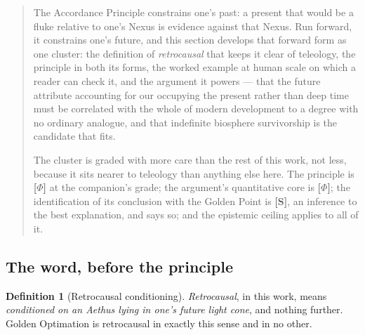 \documentclass[11pt]{article}
\numberwithin{equation}{section}
\theoremstyle{plain}
\theoremstyle{definition}
\newtheorem{definition}[theorem]{Definition}
\theoremstyle{remark}
\begin{document}
\begin{quote}\small
The Accordance Principle constrains one's past: a present that would be
a fluke relative to one's Nexus is evidence against that Nexus. Run
forward, it constrains one's future, and this section develops that
forward form as one cluster: the definition of \emph{retrocausal} that
keeps it clear of teleology, the principle in both its forms, the
worked example at human scale on which a reader can check it, and the
argument it powers --- that the future attribute accounting for our
occupying the present rather than deep time must be correlated with the
whole of modern development to a degree with no ordinary analogue, and
that indefinite biosphere survivorship is the candidate that fits.

The cluster is graded with more care than the rest of this work, not
less, because it sits nearer to teleology than anything else here. The
principle is \textbf{[$\Phi$]} at the companion's grade; the argument's
quantitative core is \textbf{[$\Phi$]}; the identification of its
conclusion with the Golden Point is \textbf{[S]}, an inference to the
best explanation, and says so; and the epistemic ceiling applies to all
of it.
\end{quote}

\subsection{The word, before the principle}\label{ra:sub:definition}

\begin{definition}[Retrocausal conditioning]\label{gc:def:retrocausal}
\emph{Retrocausal}, in this work, means \emph{conditioned on an Aethus
lying in one's future light cone}, and nothing further. Golden
Optimation is retrocausal in exactly this sense and in no other.
\end{definition}
\end{document}
